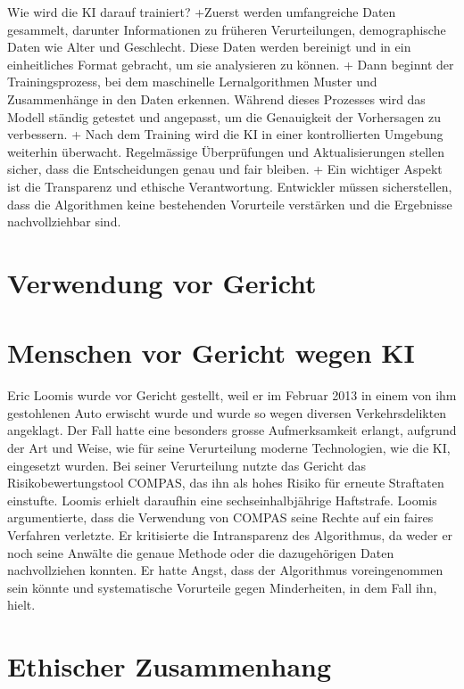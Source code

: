 \documentclass{article}
\begin{document}
Wie wird die KI darauf trainiert? 
\newline +Zuerst werden umfangreiche Daten gesammelt, darunter Informationen zu früheren Verurteilungen, 
demographische Daten wie Alter und Geschlecht. Diese Daten werden bereinigt und in ein einheitliches 
Format gebracht, um sie analysieren zu können. 
\newline  + Dann beginnt der Trainingsprozess, bei dem maschinelle Lernalgorithmen Muster und Zusammenhänge in den 
Daten erkennen. Während dieses Prozesses wird das Modell ständig getestet und angepasst, um die 
Genauigkeit der Vorhersagen zu verbessern. 
\newline + Nach dem Training wird die KI in einer kontrollierten Umgebung weiterhin überwacht. Regelmässige 
Überprüfungen und Aktualisierungen stellen sicher, dass die Entscheidungen genau und fair bleiben. 
\newline + Ein wichtiger Aspekt ist die Transparenz und ethische Verantwortung. Entwickler müssen sicherstellen, 
dass die Algorithmen keine bestehenden Vorurteile verstärken und die Ergebnisse nachvollziehbar sind. 

\section {Verwendung vor Gericht}

\section {Menschen vor Gericht wegen KI}

Eric Loomis wurde vor Gericht gestellt, weil er im Februar 2013 in einem von ihm gestohlenen Auto 
erwischt wurde und wurde so wegen diversen Verkehrsdelikten angeklagt. Der Fall hatte eine besonders grosse 
Aufmerksamkeit erlangt, aufgrund der Art und Weise, wie für seine Verurteilung moderne
Technologien, wie die KI, eingesetzt wurden.  
Bei seiner Verurteilung nutzte das Gericht das Risikobewertungstool COMPAS, das ihn als hohes Risiko für erneute 
Straftaten einstufte. Loomis erhielt daraufhin eine sechseinhalbjährige Haftstrafe.
Loomis argumentierte, dass die Verwendung von COMPAS seine Rechte auf ein faires Verfahren verletzte. Er kritisierte 
die Intransparenz des Algorithmus, da weder er noch seine Anwälte die genaue Methode oder die dazugehörigen Daten 
nachvollziehen konnten. Er hatte Angst, dass der Algorithmus voreingenommen sein könnte und systematische Vorurteile 
gegen Minderheiten, in dem Fall ihn, hielt.




\section {Ethischer Zusammenhang}







\printbibliography
\end{document}
